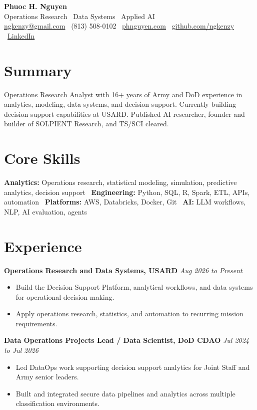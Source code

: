 \documentclass[a4paper,10pt]{article}
\begin{document}
\pagestyle{empty}

\begin{center}
    {\LARGE\bfseries Phuoc H. Nguyen}\\[2pt]
    Operations Research \textbar\ Data Systems \textbar\ Applied AI\\[2pt]
    \href{mailto:ngkenzy@gmail.com}{ngkenzy@gmail.com} \textbar\
    (813) 508-0102 \textbar\
    \href{https://phnguyen.com}{phnguyen.com} \textbar\
    \href{https://github.com/ngkenzy}{github.com/ngkenzy} \textbar\
    \href{https://linkedin.com/in/phuoc-nguyen-7634b25}{LinkedIn}
\end{center}

\small

\section*{Summary}
Operations Research Analyst with 16+ years of Army and DoD experience in analytics, modeling, data systems, and decision support. Currently building decision support capabilities at USARD. Published AI researcher, founder and builder of SOLPIENT Research, and TS/SCI cleared.

\section*{Core Skills}
\textbf{Analytics:} Operations research, statistical modeling, simulation, predictive analytics, decision support \textbar\
\textbf{Engineering:} Python, SQL, R, Spark, ETL, APIs, automation \textbar\
\textbf{Platforms:} AWS, Databricks, Docker, Git \textbar\
\textbf{AI:} LLM workflows, NLP, AI evaluation, agents

\section*{Experience}

\textbf{Operations Research and Data Systems, USARD} \hfill \textit{Aug 2026 to Present}
\begin{itemize}
    \item Build the Decision Support Platform, analytical workflows, and data systems for operational decision making.
    \item Apply operations research, statistics, and automation to recurring mission requirements.
\end{itemize}

\textbf{Data Operations Projects Lead / Data Scientist, DoD CDAO} \hfill \textit{Jul 2024 to Jul 2026}
\begin{itemize}
    \item Led DataOps work supporting decision support analytics for Joint Staff and Army senior leaders.
    \item Built and integrated secure data pipelines and analytics across multiple classification environments.
\end{itemize}
\end{document}
